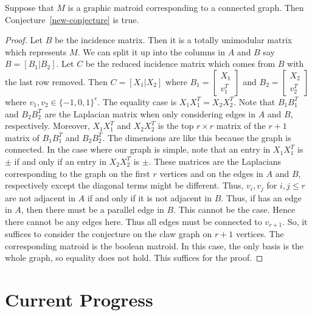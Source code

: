 \documentclass[12pt]{article}
\begin{document}
\begin{thm}
	Suppose that $M$ is a graphic matroid corresponding to a connected graph. Then Conjecture~\ref{new-conjecture} is true.
\end{thm}
\begin{proof}
	  Let $B$ be the incidence matrix. Then it is a totally unimodular matrix which represents $M$. We can split it up into the columns in $A$ and $B$ say $B = [B_1 | B_2]$. Let $C$ be the reduced incidence matrix which comes from $B$ with the last row removed. Then $C = [X_1 | X_2]$ where $B_1 = \begin{bmatrix} X_1 \\ v_1^T \end{bmatrix}$ and $B_2 = \begin{bmatrix} X_2 \\ v_2^T \end{bmatrix}$ where $v_1, v_2 \in \{-1, 0, 1\}^e$. The equality case is $X_1X_1^T = X_2X_2^T$. Note that $B_1B_1^T$ and $B_2B_2^T$ are the Laplacian matrix when only considering edges in $A$ and $B$, respectively. Moreover, $X_1X_1^T$ and $X_2X_2^T$ is the top $r \times r$ matrix of the $r+1$ matrix of $B_1B_1^T$ and $B_2B_2^T$. The dimensions are like this because the graph is connected. In the case where our graph is simple, note that an entry in $X_1X_1^T$ is $\pm$ if and only if an entry in $X_2X_2^T$ is $\pm$. These matrices are the Laplacians corresponding to the graph on the first $r$ vertices and on the edges in $A$ and $B$, respectively except the diagonal terms might be different. Thus, $v_i, v_j$ for $i, j \leq r$ are not adjacent in $A$ if and only if it is not adjacent in $B$. Thus, if has an edge in $A$, then there must be a parallel edge in $B$. This cannot be the case. Hence there cannot be any edges here. Thus all edges must be connected to $v_{r+1}$. So, it suffices to consider the conjecture on the claw graph on $r+1$ vertices. The corresponding matroid is the boolean matroid. In this case, the only basis is the whole graph, so equality does not hold. This suffices for the proof. 
\end{proof}

\section{Current Progress}
\end{document}
